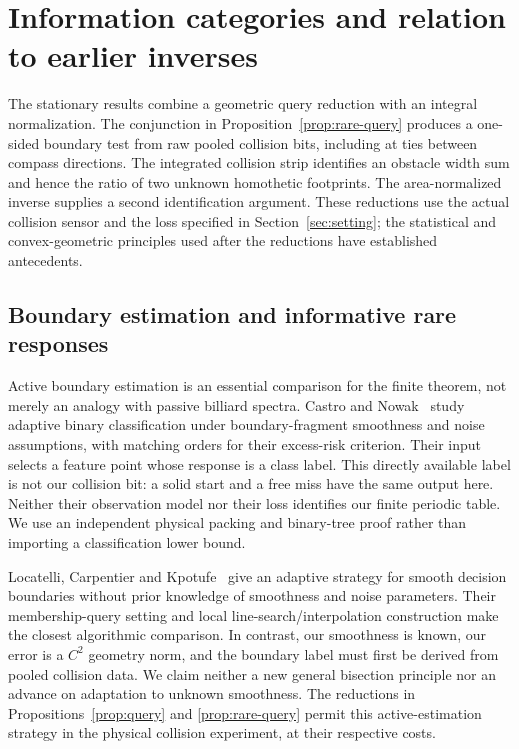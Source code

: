 \section{Information categories and relation to earlier inverses}
\label{sec:comparison}
The stationary results combine a geometric query reduction with an
integral normalization. The conjunction in
Proposition~\ref{prop:rare-query} produces a one-sided boundary test
from raw pooled collision bits, including at ties between compass
directions. The integrated collision strip identifies an obstacle
width sum and hence the ratio of two unknown homothetic footprints.
The area-normalized inverse supplies a second identification argument.
These reductions use the actual collision sensor and the loss specified
in Section~\ref{sec:setting}; the statistical and convex-geometric
principles used after the reductions have established antecedents.

\subsection{Boundary estimation and informative rare responses}
Active boundary estimation is an essential comparison for the finite
theorem, not merely an analogy with passive billiard spectra.
Castro and Nowak~\cite{CN} study adaptive binary classification under
boundary-fragment smoothness and noise assumptions, with matching
orders for their excess-risk criterion. Their input selects a feature
point whose response is a class label. This directly available label
is not our collision bit: a solid start and a free miss have the same
output here. Neither their observation model nor their loss identifies
our finite periodic table. We use an independent physical packing and
binary-tree proof rather than importing a classification lower bound.

Locatelli, Carpentier and Kpotufe~\cite{LCK} give an adaptive strategy
for smooth decision boundaries without prior knowledge of smoothness
and noise parameters. Their membership-query setting and local
line-search/interpolation construction make the closest algorithmic
comparison. In contrast, our smoothness is known, our error is a $C^2$
geometry norm, and the boundary label must first be derived from
pooled collision data. We claim neither a new general
bisection principle nor an advance on adaptation to unknown smoothness.
The reductions in Propositions~\ref{prop:query} and
\ref{prop:rare-query} permit this active-estimation strategy in the
physical collision experiment, at their respective costs.

